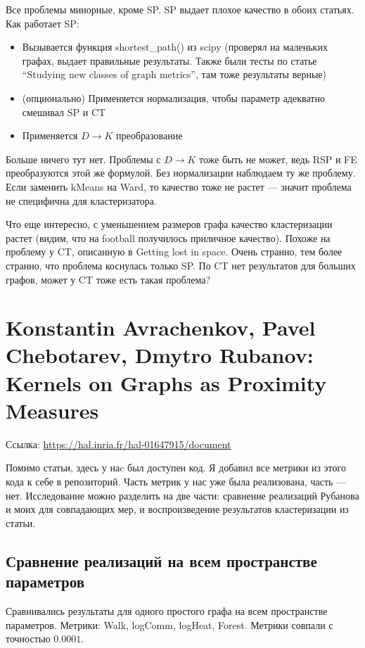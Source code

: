 \documentclass{article}
\begin{document}
Все проблемы минорные, кроме SP. SP выдает плохое качество в обоих статьях.
Как работает SP:
\begin{itemize}
  \item Вызывается функция shortest\_path() из scipy (проверял на маленьких графах, выдает правильные результаты. Также были тесты по статье ``Studying new classes of graph metrics'', там тоже результаты верные)
  \item (опционально) Применяется нормализация, чтобы параметр адекватно смешивал SP и CT
  \item Применяется $D \rightarrow K$ преобразование
\end{itemize}

Больше ничего тут нет. Проблемы с $D \rightarrow K$ тоже быть не может, ведь RSP и FE преобразуются этой же формулой. Без нормализации наблюдаем ту же проблему. Если заменить kMeans на Ward, то качество тоже не растет --- значит проблема не специфична для кластеризатора.

Что еще интересно, с уменьшением размеров графа качество кластеризации растет (видим, что на football получилось приличное качество). Похоже на проблему у CT, описанную в Getting lost in space. Очень странно, тем более странно, что проблема коснулась только SP. По CT нет результатов для больших графов, может у CT тоже есть такая проблема?


\section{Konstantin Avrachenkov, Pavel Chebotarev, Dmytro Rubanov:\\
         Kernels on Graphs as Proximity Measures}
Ссылка: \url{https://hal.inria.fr/hal-01647915/document}

Помимо статьи, здесь у наc был доступен код. Я добавил все метрики из этого кода к себе в репозиторий. Часть метрик у нас уже была реализована, часть --- нет.
Исследование можно разделить на две части: сравнение реализаций Рубанова и моих для совпадающих мер, и воспроизведение результатов кластеризации из статьи.

\subsection{Сравнение реализаций на всем пространстве параметров}
Сравнивались результаты для одного простого графа на всем пространстве параметров. Метрики: Walk, logComm, logHeat, Forest. Метрики совпали с точностью  $0.0001$.
\end{document}
